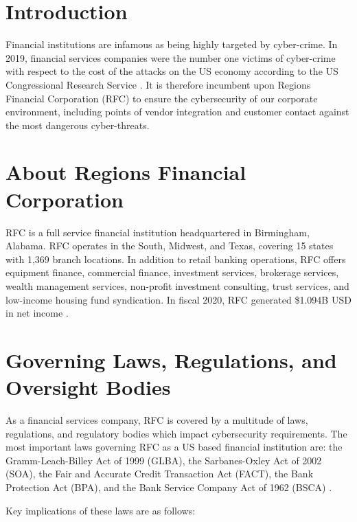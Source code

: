 \section{Introduction}

Financial institutions are infamous as being highly targeted by cyber-crime. In 2019, financial services companies were the number one victims of cyber-crime with respect to the cost of the attacks on the US economy according to the US Congressional Research Service \parencite{scottIntroductionFinancialServices2021}. It is therefore incumbent upon Regions Financial Corporation (RFC) to ensure the cybersecurity of our corporate environment, including points of vendor integration and customer contact against the most dangerous cyber-threats.

\section{About Regions Financial Corporation}

RFC is a full service financial institution headquartered in Birmingham, Alabama. RFC operates in the South, Midwest, and Texas, covering 15 states with 1,369 branch locations. In addition to retail banking operations, RFC offers equipment finance, commercial finance, investment services, brokerage services, wealth management services, non-profit investment consulting, trust services, and low-income housing fund syndication. In fiscal 2020, RFC generated \$1.094B USD in net income \parencite{regionsfinancialcorp.202010KFinal2021}.

\section{Governing Laws, Regulations, and Oversight Bodies}

As a financial services company, RFC is covered by a multitude of laws, regulations, and regulatory bodies which impact cybersecurity requirements. The most important laws governing RFC as a US based financial institution are: the Gramm-Leach-Billey Act of 1999 (GLBA), the Sarbanes-Oxley Act of 2002 (SOA), the Fair and Accurate Credit Transaction Act (FACT), the Bank Protection Act (BPA), and the Bank Service Company Act of 1962 (BSCA) \parencite{murphyFinancialServicesCybersecurity2016,scottIntroductionFinancialServices2021}.

Key implications of these laws are as follows:


